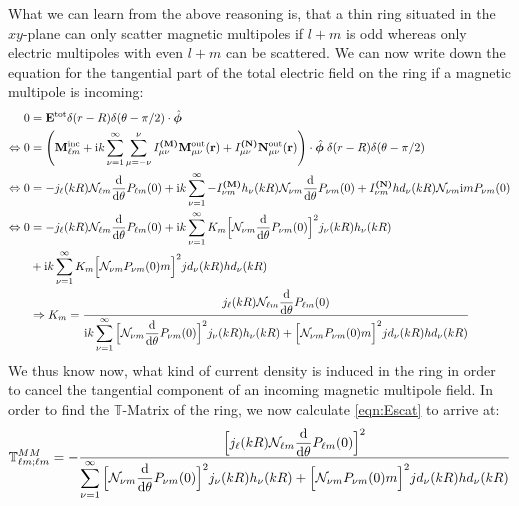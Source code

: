 What we can learn from the above reasoning is, that a thin ring situated in the $xy$-plane can only scatter magnetic multipoles if $l+m$ is odd whereas only electric multipoles with even $l+m$ can be scattered.
We can now write down the equation for the tangential part of the total electric field on the ring if a magnetic multipole is incoming:
\begin{align}
0&=\mathbf{E}^\mathrm{tot}\delta(r-R)\delta(\theta-\pi/2)\cdot \hat{\bm{\phi}} \\
\nonumber
\Leftrightarrow 0&=\left(\mathbf{M}^\mathrm{inc}_{\ell m} + \mathrm{i} k \sum_{\nu=1}^\infty  \sum_{\mu=-\nu}^\nu
I_{\mu \nu}^\textbf{(M)}\mathbf{M}^\mathrm{out}_{\mu \nu}(\mathbf{r})+
I_{\mu \nu}^\textbf{(N)}\mathbf{N}^\mathrm{out}_{\mu \nu}(\mathbf{r})\right) \cdot \hat{\bm{\phi}}
\;\delta(r-R)\delta(\theta-\pi/2)\\
\nonumber
\Leftrightarrow 0&=
-j_\ell(kR)\mathcal{N}_{\ell m}\frac{\mathrm{d}}{\mathrm{d}\theta}P_{\ell m}(0) 
+
\mathrm{i} k \sum_{\nu=1}^\infty  
-I_{\nu m}^\textbf{(M)}
h_\nu(kR)\mathcal{N}_{\nu m}\frac{\mathrm{d}}{\mathrm{d}\theta}P_{\nu m}(0) 
+
I_{\nu m}^\textbf{(N)}
hd_\nu(kR)\mathcal{N}_{\nu m}\mathrm{i} m  P_{\nu m}(0) \\ \nonumber
\Leftrightarrow
0 &= -j_\ell(kR)\mathcal{N}_{\ell m}\frac{\mathrm{d}}{\mathrm{d}\theta}P_{\ell m}(0) 
+ \mathrm{i} k\sum_{\nu = 1}^\infty
K_m\Big[
\mathcal{N}_{\nu m} \frac{\mathrm{d}}{\mathrm{d} \theta}P_{\nu m}(0)
\Big]^2 j_\nu(kR) h_\nu(kR)
\\ \nonumber
&+ \mathrm{i} k\sum_{\nu = 1}^\infty
K_m \Big[
\mathcal{N}_{\nu m} P_{\nu m}(0) m
\Big]^2jd_\nu(kR) hd_\nu(kR)
\\ \nonumber
&\Rightarrow K_m = \frac{j_\ell(kR) \mathcal{N}_{\ell m}\dfrac{\mathrm{d}}{\mathrm{d} \theta}P_{\ell m}(0)}{\mathrm{i} k \displaystyle \sum_{\nu=1}^\infty
\Big[
\mathcal{N}_{\nu m} \frac{\mathrm{d}}{\mathrm{d} \theta}P_{\nu m}(0)
\Big]^2 j_\nu(kR) h_\nu(kR)
+
\Big[
\mathcal{N}_{\nu m} P_{\nu m}(0) m
\Big]^2jd_\nu(kR) hd_\nu(kR)
}
\end{align}
We thus know now, what kind of current density is induced in the ring in order to cancel the tangential component of an incoming magnetic multipole field. In order to
find the $\mathbb{T}$-Matrix of the ring, we now calculate \cref{eqn:Escat} to arrive at:
\begin{equation}
\mathbb{T}^{MM}_{\ell m;\ell m} = -
\frac{\Big[j_\ell(kR) \mathcal{N}_{\ell m}\dfrac{\mathrm{d}}{\mathrm{d} \theta}P_{\ell m}(0)\Big]^2}{\displaystyle \sum_{\nu=1}^\infty
\Big[
\mathcal{N}_{\nu m} \frac{\mathrm{d}}{\mathrm{d} \theta}P_{\nu m}(0)
\Big]^2 j_\nu(kR) h_\nu(kR)
+
\Big[
\mathcal{N}_{\nu m} P_{\nu m}(0) m
\Big]^2jd_\nu(kR) hd_\nu(kR)
}
\end{equation}

